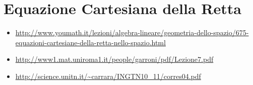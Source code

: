 \section{Equazione Cartesiana della Retta}

\begin{osservazione}
\begin{itemize}
 \item \url{http://www.youmath.it/lezioni/algebra-lineare/geometria-dello-spazio/675-equazioni-cartesiane-della-retta-nello-spazio.html}
 \item \url{http://www1.mat.uniroma1.it/people/garroni/pdf/Lezione7.pdf}
 \item \url{http://science.unitn.it/~carrara/INGTN10_11/corres04.pdf}
\end{itemize}
\end{osservazione}

